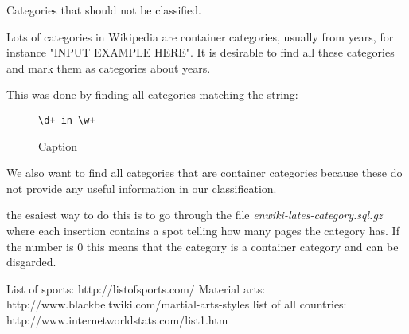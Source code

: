 

Categories that should not be classified. 

Lots of categories in Wikipedia are container categories, usually from years, for instance "INPUT EXAMPLE HERE". It is desirable to find all these categories and mark them as categories about years. 

This was done by finding all categories matching the string: 

\begin{figure}[h]
\centering
\begin{lstlisting}
\d+ in \w+
\end{lstlisting}
\caption{Caption}
\label{fig:my_label}
\end{figure}

We also want to find all categories that are container categories because these do not provide any useful information in our classification. 

the esaiest way to do this is to go through the file \emph{enwiki-lates-category.sql.gz} where each insertion contains a spot telling how many pages the category has. If the number is 0 this means that the category is a container category and can be disgarded. 

List of sports: http://listofsports.com/
Material arts: http://www.blackbeltwiki.com/martial-arts-styles
list of all countries: http://www.internetworldstats.com/list1.htm

\begin{comment}
rugby union stadiums in portugal
*rugby (sports)
*sport
*europe (travel)
*travel

Eksempel på feilklassifisering: (uønsket klassifisering)
portuguese serial killers
*europe travel

\end{comment}